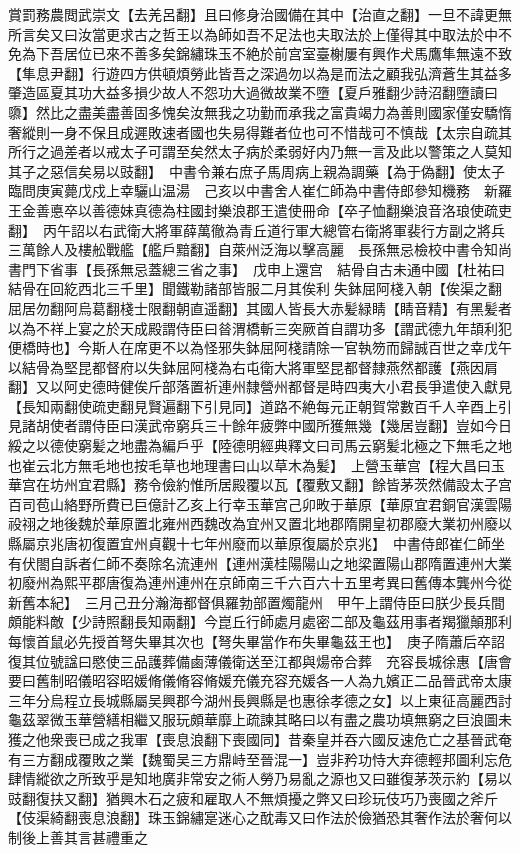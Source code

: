 賞罰務農閲武崇文【去羌呂翻】且曰修身治國備在其中【治直之翻】一旦不諱更無所言矣又曰汝當更求古之哲王以為師如吾不足法也夫取法於上僅得其中取法於中不免為下吾居位已來不善多矣錦繡珠玉不絶於前宫室臺榭屢有興作犬馬鷹隼無遠不致【隼息尹翻】行遊四方供頓煩勞此皆吾之深過勿以為是而法之顧我弘濟蒼生其益多肇造區夏其功大益多損少故人不怨功大過微故業不墮【夏戶雅翻少詩沼翻墮讀曰隳】然比之盡美盡善固多愧矣汝無我之功勤而承我之富貴竭力為善則國家僅安驕惰奢縱則一身不保且成遲敗速者國也失易得難者位也可不惜哉可不慎哉【太宗自疏其所行之過差者以戒太子可謂至矣然太子病於柔弱好内乃無一言及此以警策之人莫知其子之惡信矣易以豉翻】　中書令兼右庶子馬周病上親為調藥【為于偽翻】使太子臨問庚寅薨戊戍上幸驪山温湯　己亥以中書舍人崔仁師為中書侍郎參知機務　新羅王金善悳卒以善德妹真德為柱國封樂浪郡王遣使冊命【卒子恤翻樂浪音洛琅使疏吏翻】　丙午詔以右武衛大將軍薛萬徹為青丘道行軍大總管右衛將軍裴行方副之將兵三萬餘人及樓舩戰艦【艦戶黯翻】自萊州泛海以擊高麗　長孫無忌檢校中書令知尚書門下省事【長孫無忌蓋總三省之事】　戊申上還宫　結骨自古未通中國【杜祐曰結骨在回紇西北三千里】聞鐵勒諸部皆服二月其俟利失鉢屈阿棧入朝【俟渠之翻屈居勿翻阿烏葛翻棧士限翻朝直遥翻】其國人皆長大赤髪緑睛【睛音精】有黑髪者以為不祥上宴之於天成殿謂侍臣曰㫺渭橋斬三突厥首自謂功多【謂武德九年頡利犯便橋時也】今斯人在席更不以為怪邪失鉢屈阿棧請除一官執笏而歸誠百世之幸戊午以結骨為堅昆都督府以失鉢屈阿棧為右屯衛大將軍堅昆都督隸燕然都護【燕因肩翻】又以阿史德時健俟斤部落置祈連州隸營州都督是時四夷大小君長爭遣使入獻見【長知兩翻使疏吏翻見賢遍翻下引見同】道路不絶每元正朝賀常數百千人辛酉上引見諸胡使者謂侍臣曰漢武帝窮兵三十餘年疲弊中國所獲無幾【幾居豈翻】豈如今日綏之以德使窮髪之地盡為編戶乎【陸德明經典釋文曰司馬云窮髪北極之下無毛之地也崔云北方無毛地也按毛草也地理書曰山以草木為髪】　上營玉華宫【程大昌曰玉華宫在坊州宜君縣】務令儉約惟所居殿覆以瓦【覆敷又翻】餘皆茅茨然備設太子宫百司苞山絡野所費已巨億計乙亥上行幸玉華宫己卯畋于華原【華原宜君銅官漢雲陽祋祤之地後魏於華原置北雍州西魏改為宜州又置北地郡隋開皇初郡廢大業初州廢以縣屬京兆唐初復置宜州貞觀十七年州廢而以華原復屬於京兆】　中書侍郎崔仁師坐有伏閤自訴者仁師不奏除名流連州【連州漢桂陽陽山之地梁置陽山郡隋置連州大業初廢州為熙平郡唐復為連州連州在京師南三千六百六十五里考異曰舊傳本龔州今從新舊本紀】　三月己丑分瀚海都督俱羅勃部置燭龍州　甲午上謂侍臣曰朕少長兵間頗能料敵【少詩照翻長知兩翻】今崑丘行師處月處密二部及龜茲用事者羯獵顛那利每懷首鼠必先授首弩失畢其次也【弩失畢當作布失畢龜茲王也】　庚子隋蕭后卒詔復其位號諡曰愍使三品護葬備鹵薄儀衛送至江都與煬帝合葬　充容長城徐惠【唐會要曰舊制昭儀昭容昭媛脩儀脩容脩媛充儀充容充媛各一人為九嬪正二品晉武帝太康三年分烏程立長城縣屬吴興郡今湖州長興縣是也惠徐孝德之女】以上東征高麗西討龜茲翠微玉華營繕相繼又服玩頗華靡上疏諫其略曰以有盡之農功填無窮之巨浪圖未獲之他衆喪已成之我軍【喪息浪翻下喪國同】昔秦皇并吞六國反速危亡之基晉武奄有三方翻成覆敗之業【魏蜀吴三方鼎峙至晉混一】豈非矜功恃大弃德輕邦圖利忘危肆情縱欲之所致乎是知地廣非常安之術人勞乃易亂之源也又曰雖復茅茨示約【易以豉翻復扶又翻】猶興木石之疲和雇取人不無煩擾之弊又曰珍玩伎巧乃喪國之斧斤【伎渠綺翻喪息浪翻】珠玉錦繡寔迷心之酖毒又曰作法於儉猶恐其奢作法於奢何以制後上善其言甚禮重之

